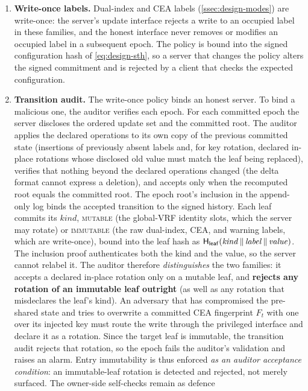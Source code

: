 \begin{enumerate}
\item \textbf{Write-once labels.} Dual-index and CEA labels (\cref{ssec:design-modes}) are
write-once: the server's update interface rejects a write to an occupied label in these families,
and the honest interface never removes or modifies an occupied label in a subsequent epoch. The policy is bound into
the signed configuration hash of \cref{eq:design-sth}, so a server that changes the policy alters the
signed commitment and is rejected by a client that checks the expected configuration.
\item \textbf{Transition audit.} The write-once policy binds an honest server. To bind a malicious
one, the auditor verifies each epoch. For each committed epoch the server discloses the ordered update
set and the committed root. The auditor applies the declared operations to its own copy of the
previous committed state (insertions of previously absent labels and, for key rotation, declared
in-place rotations whose disclosed old value must match the leaf being replaced), verifies that nothing
beyond the declared operations changed (the delta format cannot express a deletion), and accepts only
when the recomputed root equals the committed root. The epoch root's inclusion in the append-only log
binds the accepted transition to the signed history.
Each leaf commits its $\mathit{kind}$, \textsc{mutable} (the global-VRF identity slots, which the server
may rotate) or \textsc{immutable} (the raw dual-index, CEA, and warning labels, which are write-once),
bound into the leaf hash as $\mathsf{H}_{\mathsf{leaf}}(\mathit{kind} \,\|\, \mathit{label} \,\|\, \mathit{value})$.
The inclusion proof authenticates both the kind and the value, so the server
cannot relabel it. The auditor therefore \emph{distinguishes} the two families: it accepts a declared
in-place rotation only on a mutable leaf, and \textbf{rejects any rotation of an immutable leaf
outright} (as well as any rotation that misdeclares the leaf's kind). An adversary that has
compromised the pre-shared state and tries to overwrite a committed CEA fingerprint $F_t$ with one
over its injected key must route the write through the privileged interface and declare it as a
rotation. Since the target leaf is immutable, the transition audit rejects that rotation, so the
epoch fails the auditor's validation and raises an alarm. Entry immutability is thus enforced
\emph{as an auditor acceptance condition}: an immutable-leaf rotation is detected and rejected, not merely surfaced. The owner-side self-checks remain as defence

\end{enumerate}
